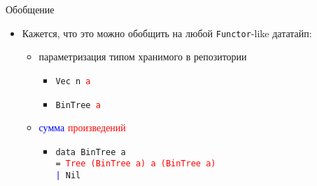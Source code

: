 \begin{frame}{Обобщение}
  \begin{itemize}
  \item Кажется, что это можно обобщить на любой \texttt{Functor}-like
    дататайп:
    \begin{itemize}
    \item параметризация типом хранимого в репозитории
      \begin{itemize}
      \item \texttt{Vec n \textcolor{red}{a}}
      \item \texttt{BinTree \textcolor{red}{a}}
      \end{itemize}
    \item \textcolor{blue}{сумма} \textcolor{red}{произведений}
      \begin{itemize}
      \item \texttt{data BinTree a\\= \textcolor{red}{Tree (BinTree a)
            a (BinTree a)} \\\textcolor{blue}{|} Nil}
      \end{itemize}
    \end{itemize}
  \end{itemize}
\end{frame}